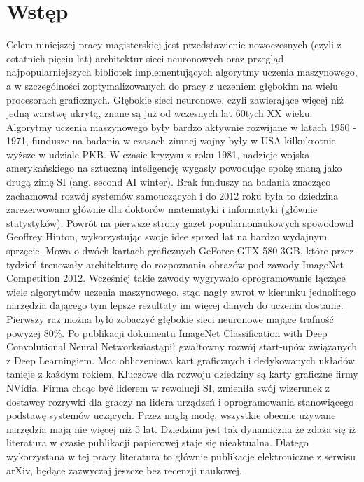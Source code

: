 \documentclass[12pt,a4paper,twoside,titlepage,openright]{book}
\begin{document}
\chapter*{Wstęp}
Celem niniejszej pracy magisterskiej jest przedstawienie nowoczesnych (czyli z ostatnich pięciu lat) architektur sieci neuronowych oraz przegląd najpopularniejszych bibliotek implementujących algorytmy uczenia maszynowego, a w szczególności zoptymalizowanych do pracy z uczeniem głębokim na wielu procesorach graficznych. Głębokie sieci neuronowe, czyli zawierające więcej niż jedną warstwę ukrytą, znane są już od wczesnych lat 60tych XX wieku. Algorytmy uczenia maszynowego były bardzo aktywnie rozwijane w latach 1950 - 1971, fundusze na badania w czasach zimnej wojny były w USA kilkukrotnie wyższe w udziale PKB. W czasie kryzysu z roku 1981, nadzieje wojska amerykańskiego na sztuczną inteligencję wygasły powodując epokę znaną jako drugą zimę SI (ang. second AI winter). Brak funduszy na badania znacząco zachamował rozwój systemów samouczących i do 2012 roku była to dziedzina zarezerwowana głównie dla doktorów matematyki i informatyki (głównie statystyków). Powrót na pierwsze strony gazet popularnonaukowych spowodował Geoffrey Hinton, wykorzystując swoje idee sprzed lat na bardzo wydajnym sprzęcie. Mowa o dwóch kartach graficznych GeForce GTX 580 3GB\cite{NIPS2012_4824}, które przez tydzień trenowały architekturę do rozpoznania obrazów pod zawody ImageNet Competition 2012. Wcześniej takie zawody wygrywało oprogramowanie łączące wiele algorytmów uczenia maszynowego, stąd nagły zwrot w kierunku jednolitego narzędzia dającego tym lepsze rezultaty im więcej danych do uczenia dostanie. Pierwszy raz można było zobaczyć głębokie sieci neuronowe mające trafność powyżej 80\%. Po publikacji dokumentu \"ImageNet Classification with Deep Convolutional Neural Networks\" nastąpił gwałtowny rozwój start-upów związanych z Deep Learningiem. Moc obliczeniowa kart graficznych i dedykowanych układów tanieje z każdym rokiem. Kluczowe dla rozwoju dziedziny są karty graficzne firmy NVidia. Firma chcąc być liderem w rewolucji SI, zmieniła swój wizerunek z dostawcy rozrywki dla graczy na lidera urządzeń i oprogramowania stanowiącego podstawę systemów uczących. Przez nagłą modę, wszystkie obecnie używane narzędzia mają nie więcej niż 5 lat. Dziedzina jest tak dynamiczna że zdaża się iż literatura w czasie publikacji papierowej staje się nieaktualna. Dlatego wykorzystana w tej pracy literatura to głównie publikacje elektroniczne z serwisu arXiv, będące zazwyczaj jeszcze bez recenzji naukowej. 
\end{document}
